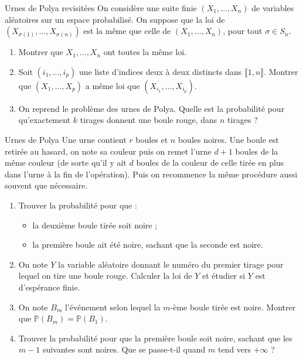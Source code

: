 \documentclass[french,a4paper]{article}
\renewcommand{\P}{\mathbb{P}}
\theoremstyle{plain}
\theoremstyle{definition}
\theoremstyle{remark}
\begin{document}
\begin{ex}[Moulin.18]{Urnes de Polya revisitées}
	On considère une suite finie $(X_1,\ldots,X_n)$ de variables aléatoires sur un espace probabilisé. On suppose que la loi de $(X_{\sigma(1)},\ldots,X_{\sigma(n)})$ est la même que celle de $(X_1,\ldots,X_n)$, pour tout $\sigma\in S_n$.
	\begin{enumerate}
		\item Montrer que $X_1,\ldots,X_n$ ont toutes la même loi.
		\item Soit $(i_1,\ldots,i_p)$ une liste d'indices deux à deux distincts dans $\llbracket1,n\rrbracket$. Montrer que $(X_1,\ldots,X_p)$ a même loi que $(X_{i_1},\ldots,X_{i_p})$.
		\item On reprend le problème des urnes de Polya. Quelle est la probabilité pour qu'exactement $k$ tirages donnent une boule rouge, dans $n$ tirages ?
	\end{enumerate}
\end{ex}

\begin{ex}[Châteaux]{Urnes de Polya}
	Une urne contient $r$ boules et $n$ boules noires. Une boule est retirée au hasard, on note sa couleur puis on remet l'urne $d+1$ boules de la même couleur (de sorte qu'il y ait $d$ boules de la couleur de celle tirée en plus dans l'urne à la fin de l'opération). Puis on recommence la même procédure aussi souvent que nécessaire.
	\begin{enumerate}
		\item Trouver la probabilité pour que : 
		\begin{itemize}
			\item la deuxième boule tirée soit noire ;
			\item la première boule ait été noire, sachant que la seconde est noire.
		\end{itemize}
		\item On note $Y$ la variable aléatoire donnant le numéro du premier tirage pour lequel on tire une boule rouge. Calculer la loi de $Y$ et étudier si $Y$ est d'espérance finie.
		\item On note $B_m$ l'événement selon lequel la $m$-ème boule tirée est noire. Montrer que $\P(B_m)=\P(B_1)$.
		\item Trouver la probabilité pour que la première boule soit noire, sachant que les $m-1$ suivantes sont noires. Que se passe-t-il quand $m$ tend vers $+\infty$ ?
	\end{enumerate}
\end{ex}
\end{document}
